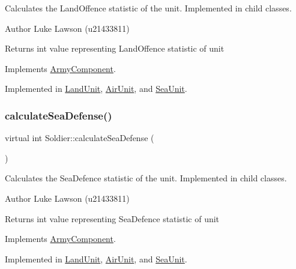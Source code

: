 Calculates the Land\+Offence statistic of the unit. Implemented in child classes. 

\begin{DoxyAuthor}{Author}
Luke Lawson (u21433811) 
\end{DoxyAuthor}
\begin{DoxyReturn}{Returns}
int value representing Land\+Offence statistic of unit 
\end{DoxyReturn}


Implements \mbox{\hyperlink{class_army_component_a0556ff6dbfa956f9ab52aadaa6a331e1}{Army\+Component}}.



Implemented in \mbox{\hyperlink{class_land_unit_a8f95f94a08fbdd268b85160dbd578947}{Land\+Unit}}, \mbox{\hyperlink{class_air_unit_ab5f13baf31eafe62bf482ec4501f4975}{Air\+Unit}}, and \mbox{\hyperlink{class_sea_unit_a5b21e648106a6ec40c79a1916e9fe674}{Sea\+Unit}}.

\mbox{\label{class_soldier_a6508d8539b427a9af01aabc07ba6ca8e}} 
\subsubsection{\texorpdfstring{calculateSeaDefense()}{calculateSeaDefense()}}
{\footnotesize\ttfamily virtual int Soldier\+::calculate\+Sea\+Defense (\begin{DoxyParamCaption}{ }\end{DoxyParamCaption})\hspace{0.3cm}{\ttfamily [pure virtual]}}



Calculates the Sea\+Defence statistic of the unit. Implemented in child classes. 

\begin{DoxyAuthor}{Author}
Luke Lawson (u21433811) 
\end{DoxyAuthor}
\begin{DoxyReturn}{Returns}
int value representing Sea\+Defence statistic of unit 
\end{DoxyReturn}


Implements \mbox{\hyperlink{class_army_component_af5656dd9c12738ec90ea7886fd7ee34a}{Army\+Component}}.



Implemented in \mbox{\hyperlink{class_land_unit_a5a0d88fe84b7700e9e85f6c3c1f1af9d}{Land\+Unit}}, \mbox{\hyperlink{class_air_unit_ab7cd17470efa06d53df2ad5be3964e7a}{Air\+Unit}}, and \mbox{\hyperlink{class_sea_unit_a04480810f175b4c0c7d5b54e9397605f}{Sea\+Unit}}.

